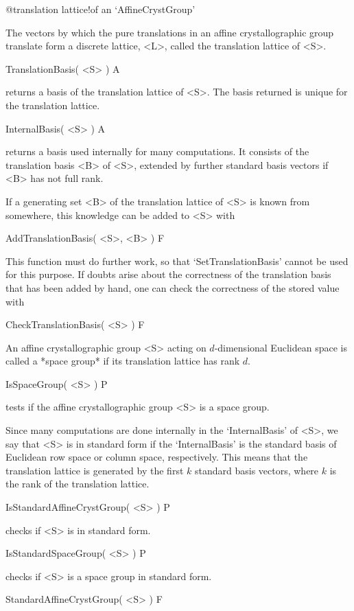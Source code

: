 %
{@translation lattice!of an \noexpand`AffineCrystGroup'}

The vectors by which the pure translations in an affine
crystallographic group translate form a discrete lattice, <L>,
called the translation lattice of <S>.

\>TranslationBasis( <S> ) A

returns a basis of the translation lattice of <S>. The basis returned
is unique for the translation lattice.

\>InternalBasis( <S> ) A

returns a basis used internally for many computations. It consists
of the translation basis <B> of <S>, extended by further standard
basis vectors if <B> has not full rank. 

If a generating set <B> of the translation lattice of <S> is known
from somewhere, this knowledge can be added to <S> with
 
\>AddTranslationBasis( <S>, <B> ) F

This function must do further work, so that `SetTranslationBasis'
cannot be used for this purpose.  If doubts arise about the
correctness of the translation basis that has been added by hand, 
one can check the correctness of the stored value with

\>CheckTranslationBasis( <S> ) F

An affine crystallographic group <S> acting on $d$-dimensional Euclidean
space is called a *space group* if its translation lattice has rank $d$.

\>IsSpaceGroup( <S> ) P

tests if the affine crystallographic group <S> is a space group.

Since many computations are done internally in the `InternalBasis' of
<S>, we say that <S> is in standard form if the `InternalBasis' is the
standard basis of Euclidean row space or column space, respectively. 
This means that the translation lattice is generated by the first $k$ 
standard basis vectors, where $k$ is the rank of the translation lattice.

\>IsStandardAffineCrystGroup( <S> ) P

checks if <S> is in standard form.

\>IsStandardSpaceGroup( <S> ) P

checks if <S> is a space group in standard form.

\>StandardAffineCrystGroup( <S> ) F


